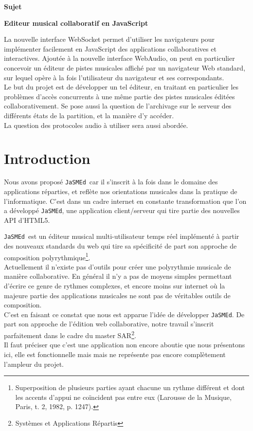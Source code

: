 \documentclass[pdftex,12pt,a4paper]{article}
\newcommand{\jasmed}{\texttt{JaSMEd}}
\begin{document}



\begin{center}
{\huge \bfseries Sujet}\\[1.5cm]
\end{center}
{\Large \bfseries Editeur musical collaboratif en JavaScript}

\bigskip
La nouvelle interface WebSocket permet d’utiliser les navigateurs pour implémenter facilement en JavaScript des applications collaboratives et interactives. Ajoutée à la nouvelle interface WebAudio, on peut en particulier concevoir un éditeur de pistes musicales affiché par un navigateur Web standard, sur lequel opère à la fois l’utilisateur du navigateur et ses correspondants.\\
Le but du projet est de développer un tel éditeur, en traitant en particulier les problèmes d’accès concurrents à une même partie des pistes musicales éditées collaborativement. Se pose aussi la question de l’archivage sur le serveur des différents états de la partition, et la manière d’y accéder.\\
La question des protocoles audio à utiliser sera aussi abordée.

\vfill

\pagebreak

\tableofcontents

\pagebreak

\section{Introduction}

Nous avons proposé \jasmed\ car il s'inscrit à la fois dans le domaine des applications réparties, et reflète nos orientations musicales dans la pratique de l'informatique.
C'est dans un cadre internet en constante transformation que l'on a développé \jasmed, une application client/serveur qui tire partie des nouvelles API d’HTML5.

\medskip
\jasmed\ est un éditeur musical multi-utilisateur temps réel implémenté à partir des nouveaux standards du web qui tire sa spécificité de part son approche de composition polyrythmique\footnote{Superposition de plusieurs parties ayant chacune un rythme différent et dont les accents d'appui ne coïncident pas entre eux (Larousse de la Musique, Paris, t. 2, 1982, p. 1247).}.\\
Actuellement il n'existe pas d'outils pour créer une polyrythmie musicale de manière collaborative. En général il n'y a pas de moyens simples permettant d'écrire ce genre de rythmes complexes, et encore moins sur internet où la majeure partie des applications musicales ne sont pas de véritables outils de composition.\\
C'est en faisant ce constat que nous est apparue l'idée de développer \jasmed.
De part son approche de l'édition web collaborative, notre travail s'inscrit parfaitement dans le cadre du master SAR\footnote{Systèmes et Applications Répartis}.\\
Il faut préciser que c'est une application non encore aboutie que nous présentons ici, elle est fonctionnelle mais mais ne représente pas encore complètement l'ampleur du projet.
\end{document}
